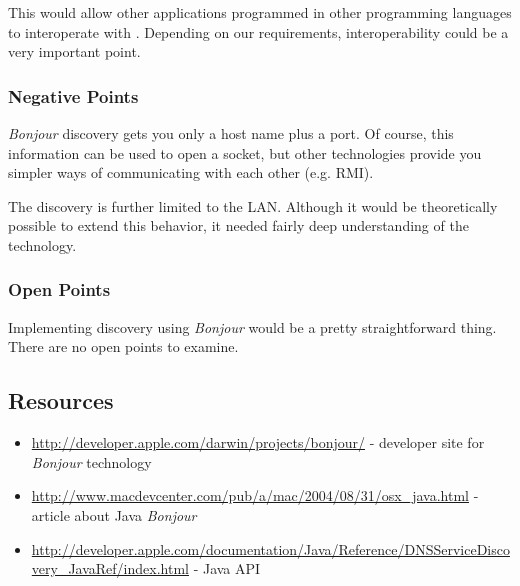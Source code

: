This would allow other applications programmed in other programming languages to interoperate with \ace. Depending on our requirements, interoperability could be a very important point.

\subsubsection{Negative Points}
\emph{Bonjour} discovery gets you only a host name plus a port. Of course, this information can be used to open a socket, but other technologies provide you simpler ways of communicating with each other (e.g. RMI).

The discovery is further limited to the LAN. Although it would be theoretically possible to extend this behavior, it needed fairly deep understanding of the technology.

\subsubsection{Open Points}
Implementing discovery using \emph{Bonjour} would be a pretty straightforward thing. There are no open points to examine.



\subsection{Resources}
\begin{itemize}
 \item \url{http://developer.apple.com/darwin/projects/bonjour/} - developer site for \emph{Bonjour} technology
 \item \url{http://www.macdevcenter.com/pub/a/mac/2004/08/31/osx_java.html} - article about Java \emph{Bonjour}
 \item \url{http://developer.apple.com/documentation/Java/Reference/DNSServiceDiscovery_JavaRef/index.html} - Java API
\end{itemize}

